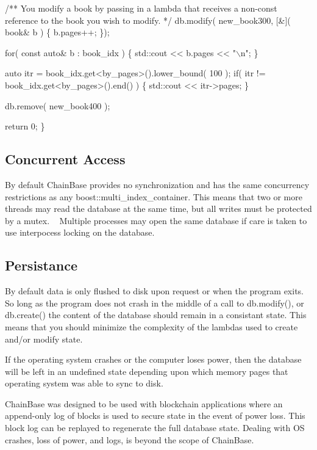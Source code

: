 \begin{DoxyCode}
   /**
      You modify a book by passing in a lambda that receives a
      non-const reference to the book you wish to modify. 
   */
   db.modify( new\_book300, [&]( book& b ) \{
      b.pages++;
   \});

   for( const auto& b : book\_idx ) \{
      std::cout << b.pages << "\(\backslash\)n";
   \}

   auto itr = book\_idx.get<by\_pages>().lower\_bound( 100 );
   if( itr != book\_idx.get<by\_pages>().end() ) \{
      std::cout << itr->pages;
   \}

   db.remove( new\_book400 );

   return 0;
\}
\end{DoxyCode}


\subsection*{Concurrent Access}

By default Chain\+Base provides no synchronization and has the same concurrency restrictions as any boost\+::multi\+\_\+index\+\_\+container. This means that two or more threads may read the database at the same time, but all writes must be protected by a mutex. ~\newline
 Multiple processes may open the same database if care is taken to use interpocess locking on the database. ~\newline
 \subsection*{Persistance}

By default data is only flushed to disk upon request or when the program exits. So long as the program does not crash in the middle of a call to db.\+modify(), or db.\+create() the content of the database should remain in a consistant state. This means that you should minimize the complexity of the lambdas used to create and/or modify state.

If the operating system crashes or the computer loses power, then the database will be left in an undefined state depending upon which memory pages that operating system was able to sync to disk.

Chain\+Base was designed to be used with blockchain applications where an append-\/only log of blocks is used to secure state in the event of power loss. This block log can be replayed to regenerate the full database state. Dealing with OS crashes, loss of power, and logs, is beyond the scope of Chain\+Base.

